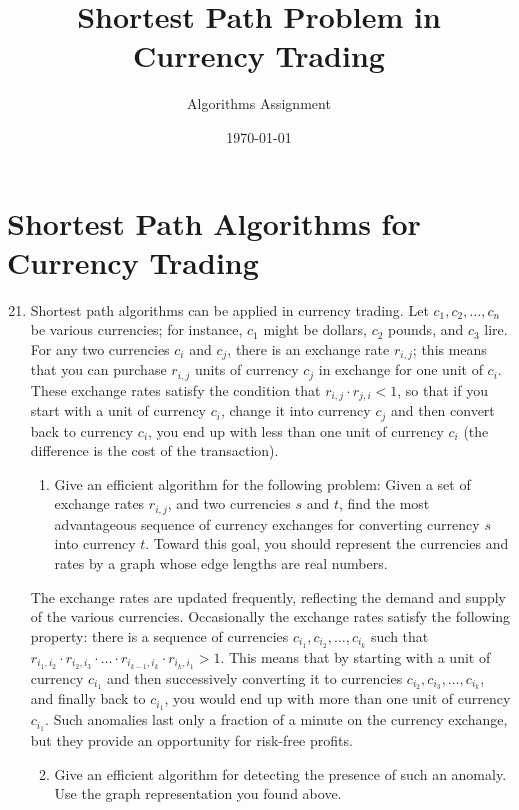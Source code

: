 \documentclass[12pt]{article}
\title{Shortest Path Problem in Currency Trading}
\author{Algorithms Assignment}
\date{\today}
\begin{document}
\maketitle

\section*{Shortest Path Algorithms for Currency Trading}

\begin{enumerate}[label=\textbf{4.\arabic*.}]
\setcounter{enumi}{20}

\item Shortest path algorithms can be applied in currency trading. Let $c_1, c_2, \ldots, c_n$ be various currencies;
for instance, $c_1$ might be dollars, $c_2$ pounds, and $c_3$ lire. For any two currencies $c_i$ and
$c_j$, there is an exchange rate $r_{i,j}$; this means that you can purchase $r_{i,j}$ units of currency $c_j$ in
exchange for one unit of $c_i$. These exchange rates satisfy the condition that $r_{i,j} \cdot r_{j,i} < 1$, so that if
you start with a unit of currency $c_i$, change it into currency $c_j$ and then convert back to currency
$c_i$, you end up with less than one unit of currency $c_i$ (the difference is the cost of the transaction).

\begin{enumerate}[label=(\alph*)]
\item Give an efficient algorithm for the following problem: Given a set of exchange rates $r_{i,j}$,
and two currencies $s$ and $t$, find the most advantageous sequence of currency exchanges for
converting currency $s$ into currency $t$. Toward this goal, you should represent the currencies
and rates by a graph whose edge lengths are real numbers.
\end{enumerate}

The exchange rates are updated frequently, reflecting the demand and supply of the various
currencies. Occasionally the exchange rates satisfy the following property: there is a sequence of
currencies $c_{i_1}, c_{i_2}, \ldots, c_{i_k}$ such that $r_{i_1,i_2} \cdot r_{i_2,i_3} \cdot \ldots \cdot r_{i_{k-1},i_k} \cdot r_{i_k,i_1} > 1$. This means that by starting
with a unit of currency $c_{i_1}$ and then successively converting it to currencies $c_{i_2}, c_{i_3}, \ldots, c_{i_k}$, and
finally back to $c_{i_1}$, you would end up with more than one unit of currency $c_{i_1}$. Such anomalies
last only a fraction of a minute on the currency exchange, but they provide an opportunity for
risk-free profits.

\begin{enumerate}[label=(\alph*)]
\setcounter{enumii}{1}
\item Give an efficient algorithm for detecting the presence of such an anomaly. Use the graph
representation you found above.
\end{enumerate}

\end{enumerate}
\end{document}

